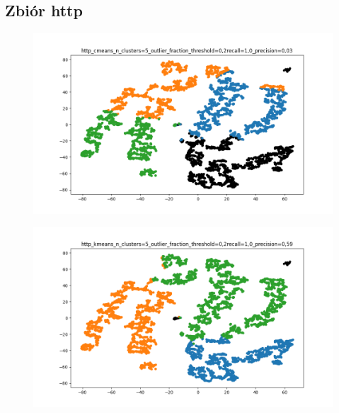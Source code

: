 \documentclass{classrep}
\begin{document}
{        \subsection{Zbiór http} {

            \begin{figure}[!htbp]
                \centering
                \includegraphics[width=\textwidth]{img/http_cmeans_n_clusters=5_outlier_fraction_threshold=0,2-183301.png}
                \caption{}
                \label{fig:http_cmeans}
            \end{figure}

            \begin{figure}[!htbp]
                \centering
                \includegraphics[width=\textwidth]{img/http_kmeans_n_clusters=5_outlier_fraction_threshold=0,2-183849.png}
                \caption{}
                \label{fig:http_kmeans}
            \end{figure}

}}
\end{document}
